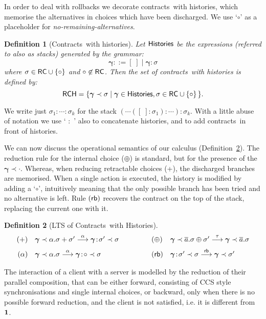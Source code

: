 \documentclass[UKenglish]{eptcs}
\newtheorem{definition}{Definition}[section]
\renewcommand{\vec}[1]{\bm{#1}}
\newcommand{\cons}{\!:\!}
\newcommand{\ored}[1]{\stackrel{#1}{\longrightarrow}}      \newcommand{\Ored}[1]{\stackrel{#1}{\Longrightarrow}}
\newcommand{\rb}{\sf rb}
\newcommand{\Dual}[1]{\overline{#1}}
\newcommand{\lts}[1]{\stackrel{#1}{\longrightarrow}}
\newcommand{\stopA}{{\bf 1}}
\newcommand{\Sbehav}{{\sf RC}}
\newcommand{\SbehavH}{{\sf RCH}}
\newcommand{\Stacks}{{\sf Histories}}
\newcommand{\emptystack}{[\;]}
\newcommand{\back}{\prec}
\newcommand{\np}[2]{#1\back#2}
\newcommand{\ctrs}{contracts}
\newcommand{\Ctrs}{Contracts}
\begin{document}
In order to deal with rollbacks we decorate \ctrs\ with histories, which memorise the alternatives in choices which have been discharged. We use `$\circ$' as a placeholder for {\em no-remaining-alternatives}.

\begin{definition}[\Ctrs\ with histories]
Let $\Stacks$  be the expressions (referred to also as {\em stacks}) generated by the grammar:
$$\vec{\gamma} ::= \emptystack \mid  \vec{\gamma} \cons  \sigma$$
where $\sigma\in\Sbehav\cup\{\circ\}$ and $\circ\not\in\Sbehav$. Then the set of {\em \ctrs\ with histories} is defined by:
$$\SbehavH = \{ \np{\vec{\gamma}}\sigma \mid \vec{\gamma}\in \Stacks, \sigma\in \Sbehav\cup\{\circ\}\, \}.$$
\end{definition}
\noindent
We write just $\sigma_1\cons \cdots \cons \sigma_k$ for the stack $(\cdots(\emptystack\cons \sigma_1) \cons \cdots )\cons \sigma_{k}$. With a little abuse of notation we use ` $\cons$ ' also to concatenate histories, and to add \ctrs\ in front of histories.

\bigskip

We can now discuss the operational semantics of our calculus (Definition~\ref{scs}). The reduction rule for the internal choice ($\oplus$) is standard, but for the presence of the $\np{\vec{\gamma}}{\cdot}$. Whereas, when reducing retractable choices (+), the discharged branches are memorised. When a single action is executed, the history is modified by adding a `$\circ$', intuitively meaning that the only possible branch has been tried and no alternative is left. Rule $(\rb)$ recovers the contract on the top of the stack, replacing the current one with it.

\begin{definition}[LTS of \Ctrs\ with Histories]\label{scs}
\[\begin{array}{rl@{\hspace{16mm}}ll}
(+) & \np{\vec{\gamma}}{\alpha.\sigma + \sigma'}
			\ored{\alpha} 
	\np{\vec{\gamma} \cons \sigma'}\sigma  & 
(\oplus) &  \np{\vec{\gamma}}{{ \Dual{a}.\sigma \oplus \sigma'}}
			\ored{\tau} 
		\np{\vec{\gamma}}\Dual{a}.\sigma 
\\ [2mm]
(\alpha)
& \np{\vec{\gamma}}\alpha.\sigma \ored{\alpha} \np{\vec{\gamma}\cons\circ}{\sigma}
&
(\rb)  &
	\np{\vec{\gamma}\cons\sigma'}{\sigma}  \lts{\rb}  \np{\vec{\gamma}}\sigma'
\end{array}\]
\end{definition}


The interaction of a client with a server is modelled by the reduction of their parallel composition, that can be either
forward, consisting of CCS style synchronisations and single internal choices, or backward, only when there is no possible forward reduction, and the client is not satisfied, i.e. it is different from $\stopA$. 
\end{document}
